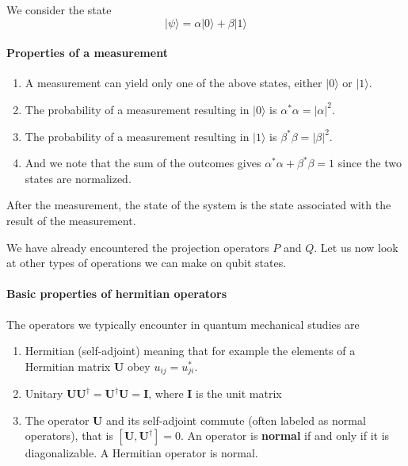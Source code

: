 We  consider the state
\[
\vert \psi\rangle = \alpha \vert 0 \rangle +\beta \vert 1 \rangle
\]


\paragraph{Properties of a measurement}

\begin{enumerate}
\item A measurement can yield only one of the above states, either $\vert 0\rangle$ or $\vert 1\rangle$.

\item The probability of a measurement resulting in $\vert 0\rangle$ is $\alpha^*\alpha = \vert \alpha \vert^2$.

\item The probability of a measurement resulting in $\vert 1\rangle$ is $\beta^*\beta = \vert \beta \vert^2$.

\item And we note that the sum of the outcomes gives $\alpha^*\alpha+\beta^*\beta=1$ since the two states are normalized.
\end{enumerate}


After the measurement, the state of the system is the state associated with the result of the measurement.

We have already encountered the projection operators $P$ and $Q$. Let
us now look at other types of operations we can make on qubit states.


\paragraph{Basic properties of hermitian operators}

The operators we typically encounter in quantum mechanical studies are
\begin{enumerate}
\item Hermitian (self-adjoint) meaning that for example the elements of a Hermitian matrix $\bm{U}$ obey $u_{ij}=u_{ji}^*$.

\item Unitary $\bm{U}\bm{U}^{\dagger}=\bm{U}^{\dagger}\bm{U}=\bm{I}$, where $\bm{I}$ is the unit matrix

\item The operator $\bm{U}$ and its self-adjoint commute (often labeled as normal operators), that is  $[\bm{U},\bm{U}^{\dagger}]=0$. An operator is \textbf{normal} if and only if it is diagonalizable. A Hermitian operator is normal.
\end{enumerate}


